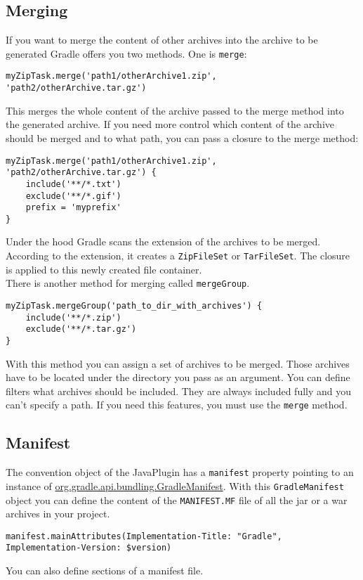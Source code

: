 \subsection{Merging} %
\label{sub:merging}
If you want to merge the content of other archives into the archive to be generated Gradle offers you two methods. One is \texttt{merge}:
\begin{Verbatim}
myZipTask.merge('path1/otherArchive1.zip', 'path2/otherArchive.tar.gz')
\end{Verbatim} 
This merges the whole content of the archive passed to the merge method into the generated archive. If you need more control which content of the archive should be merged and to what path, you can pass a closure to the merge method:
\begin{Verbatim}
myZipTask.merge('path1/otherArchive1.zip', 'path2/otherArchive.tar.gz') {
	include('**/*.txt')
	exclude('**/*.gif')
	prefix = 'myprefix'
}
\end{Verbatim}
Under the hood Gradle scans the extension of the archives to be merged. According to the extension, it creates a \texttt{ZipFileSet} or \texttt{TarFileSet}. The closure is applied to this newly created file container.  
\\
\noindent There is another method for merging called \texttt{mergeGroup}.
\begin{Verbatim}
myZipTask.mergeGroup('path_to_dir_with_archives') {
	include('**/*.zip')
	exclude('**/*.tar.gz')
}
\end{Verbatim}
With this method you can assign a set of archives to be merged. Those archives have to be located under the directory you pass as an argument. You can define filters what archives should be included. They are always included fully and you can't specify a path. If you need this features, you must use the \texttt{merge} method.  
\subsection{Manifest} %
\label{sub:manifest}
The convention object of the JavaPlugin has a \texttt{manifest} property pointing to an instance of \href{\API tasks/bundling/GradleManifest.html}{org.gradle.api.bundling.GradleManifest}. With this \texttt{GradleManifest} object you can define the content of the \texttt{MANIFEST.MF} file of all the jar or a war archives in your project. 
\begin{Verbatim}
manifest.mainAttributes(Implementation-Title: "Gradle", Implementation-Version: $version)
\end{Verbatim}
You can also define sections of a manifest file.

